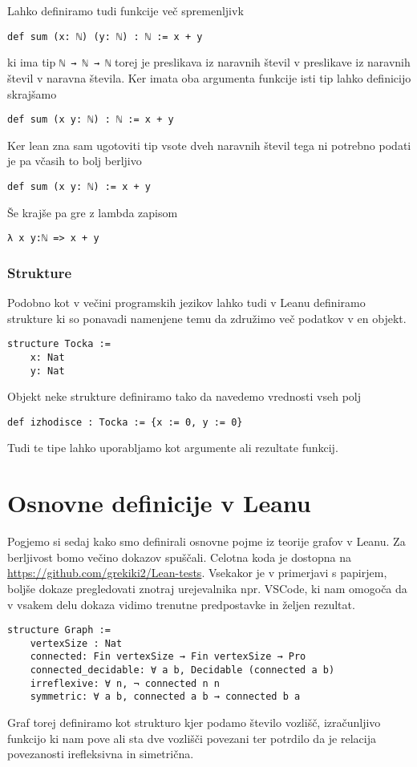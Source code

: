 \documentclass[mat1]{fmfdelo}
\begin{document}
Lahko definiramo tudi funkcije več spremenljivk
\begin{lstlisting}
def sum (x: ℕ) (y: ℕ) : ℕ := x + y
\end{lstlisting}
ki ima tip \lstinline{ℕ → ℕ → ℕ} torej je preslikava iz naravnih števil v preslikave iz naravnih števil v naravna števila.
Ker imata oba argumenta funkcije isti tip lahko definicijo skrajšamo
\begin{lstlisting}
def sum (x y: ℕ) : ℕ := x + y
\end{lstlisting}
Ker lean zna sam ugotoviti tip vsote dveh naravnih števil tega ni potrebno podati je pa včasih to bolj berljivo
\begin{lstlisting}
def sum (x y: ℕ) := x + y
\end{lstlisting}
Še krajše pa gre z lambda zapisom
\begin{lstlisting}
λ x y:ℕ => x + y
\end{lstlisting}

\subsubsection{Strukture}
Podobno kot v večini programskih jezikov lahko tudi v Leanu definiramo strukture ki so ponavadi namenjene temu da združimo več podatkov v en objekt.
\begin{lstlisting}
structure Tocka :=
    x: Nat
    y: Nat
\end{lstlisting}
Objekt neke strukture definiramo tako da navedemo vrednosti vseh polj
\begin{lstlisting}
def izhodisce : Tocka := {x := 0, y := 0}
\end{lstlisting}
Tudi te tipe lahko uporabljamo kot argumente ali rezultate funkcij.




\section{Osnovne definicije v Leanu}
Pogjemo si sedaj kako smo definirali osnovne pojme iz teorije grafov v Leanu.
Za berljivost bomo večino dokazov spuščali.
Celotna koda je dostopna na \url{https://github.com/grekiki2/Lean-tests}.
Vsekakor je v primerjavi s papirjem, boljše dokaze pregledovati znotraj urejevalnika npr. VSCode, ki nam omogoča da v vsakem delu dokaza vidimo 
trenutne predpostavke in željen rezultat. 

\begin{lstlisting}
structure Graph :=
    vertexSize : Nat
    connected: Fin vertexSize → Fin vertexSize → Pro
    connected_decidable: ∀ a b, Decidable (connected a b)
    irreflexive: ∀ n, ¬ connected n n
    symmetric: ∀ a b, connected a b → connected b a
\end{lstlisting}
Graf torej definiramo kot strukturo kjer podamo število vozlišč, izračunljivo funkcijo ki nam pove
ali sta dve vozlišči povezani ter potrdilo da je relacija povezanosti irefleksivna in simetrična.
\end{document}
